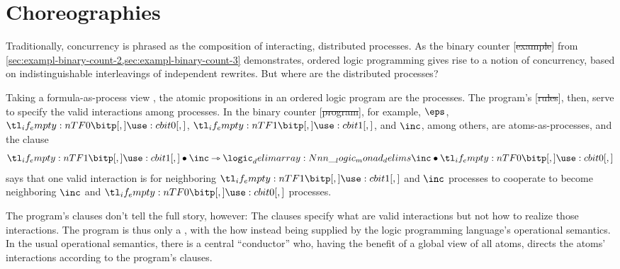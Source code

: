 \section{Choreographies}\label{sec:choreographies}

Traditionally, concurrency is phrased as the composition of interacting, distributed processes.
As the binary counter [\st{example}] from \cref{sec:exampl-binary-count-2,sec:exampl-binary-count-3} demonstrates, ordered logic programming gives rise to a notion of concurrency, based on indistinguishable interleavings of independent rewrites.
But where are the distributed processes?

Taking a formula-as-process view \autocites{Miller:ELP92}{Cervesato+Scedrov:IC09}, the atomic propositions in an ordered logic program are the processes.
The program's [\st{rules}], then, serve to specify the valid interactions among processes. 
In the binary counter [\st{program}], for example, $\eps$, $\bit{0}$, $\bit{1}$, and $\inc$, among others,
are
atoms-as-processes,
and the clause
\begin{equation*}
  \bit{1} \fuse \inc \lrimp \monad{\inc \fuse \bit{0}}
\end{equation*}
says that one valid interaction is for neighboring $\bit{1}$ and $\inc$ processes to cooperate to become neighboring $\inc$ and $\bit{0}$ processes.

The program's clauses don't tell the full story, however:
The clauses specify what are valid interactions but not how to realize those interactions.
The program is thus only a , with the how instead being supplied by the logic programming language's operational semantics.
In the usual operational semantics, there is a central \enquote{conductor} who, having the benefit of a global view of all atoms, directs the atoms' interactions according to the program's clauses.

